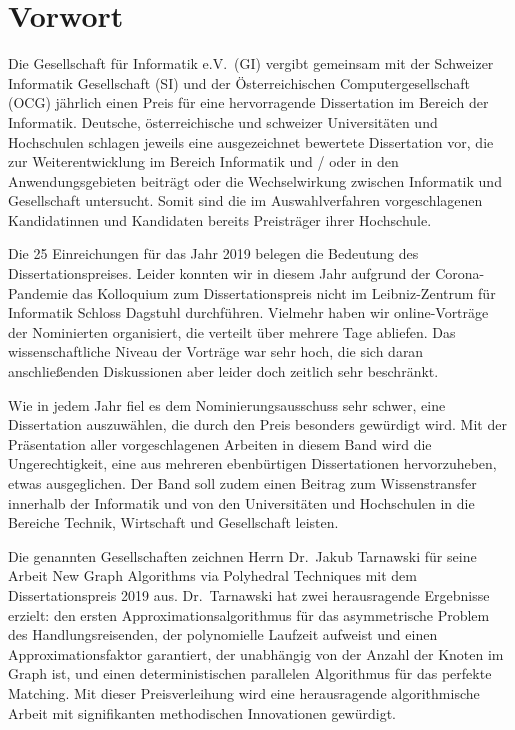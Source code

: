 \documentclass{lni}
\begin{document}
\setcounter{page}{3}
\pagestyle{fancy}
\lhead[\fancyplain{}{\small\thepage}]{\fancyplain{}}
\rhead[\fancyplain{}]{\fancyplain{}{\small\thepage}}
\cfoot{}

\section*{Vorwort}

\newcommand{\Zitat}[1]{\glqq#1\grqq}

Die Gesellschaft für Informatik e.V.\ (GI) vergibt gemeinsam mit der Schweizer Informatik Gesellschaft (SI) und der Österreichischen Computergesellschaft (OCG) jährlich einen Preis für eine hervorragende Dissertation im Bereich der Informatik. Deutsche, österreichische und schweizer Universitäten und Hochschulen schlagen jeweils eine ausgezeichnet bewertete Dissertation vor, die zur Weiterentwicklung im Bereich Informatik und / oder in den Anwendungsgebieten beiträgt oder die Wechselwirkung zwischen Informatik und Gesellschaft untersucht. Somit sind die
im Auswahlverfahren vorgeschlagenen Kandidatinnen und Kandidaten bereits
\Zitat{Preisträger} ihrer Hochschule.

Die 25 Einreichungen für das Jahr 2019 belegen die Bedeutung des Dissertationspreises. Leider konnten wir in diesem Jahr aufgrund der Corona-Pandemie das Kolloquium zum Dissertationspreis nicht im Leibniz-Zentrum für Informatik Schloss Dagstuhl durchführen. Vielmehr haben wir online-Vorträge der Nominierten organisiert, die verteilt über mehrere Tage abliefen. Das wissenschaftliche Niveau der Vorträge war sehr hoch, die sich daran anschlie\ss{}enden Diskussionen aber leider doch zeitlich sehr beschränkt. 

Wie in jedem Jahr fiel es dem Nominierungsausschuss sehr schwer, eine Dissertation auszuwählen, die durch den Preis besonders gewürdigt wird. Mit
der Präsentation aller vorgeschlagenen Arbeiten in diesem Band wird die
Ungerechtigkeit, eine aus mehreren ebenbürtigen Dissertationen hervorzuheben,
etwas ausgeglichen. Der Band soll zudem einen Beitrag zum Wissenstransfer
innerhalb der Informatik und von den Universitäten und Hochschulen in die
Bereiche Technik, Wirtschaft und Gesellschaft leisten.

Die genannten Gesellschaften zeichnen Herrn Dr.~Jakub Tarnawski  für seine Arbeit \Zitat{New Graph Algorithms via Polyhedral Techniques} mit dem Dissertationspreis 2019 aus. \linebreak Dr.~Tarnawski hat zwei herausragende Ergebnisse erzielt: den ersten Approximationsalgorithmus f\"{u}r das asymmetrische Problem des Handlungsreisenden, der polynomielle Laufzeit aufweist und einen Approximationsfaktor garantiert, der unabh\"angig von der Anzahl der Knoten im Graph ist, und einen deterministischen parallelen Algorithmus f\"ur das perfekte Matching. 
Mit dieser Preisverleihung wird eine herausragende algorithmische Arbeit mit signifikanten methodischen  Innovationen gewürdigt. 
\end{document}
